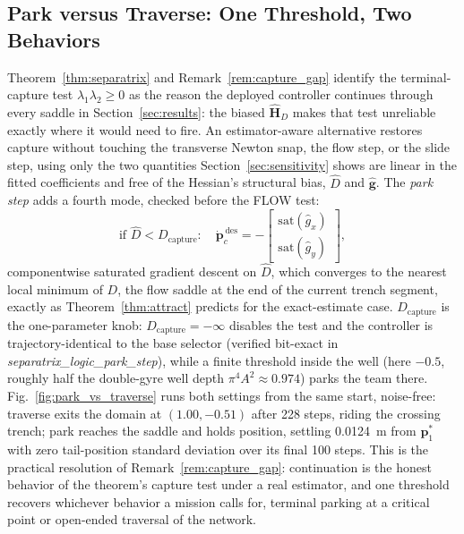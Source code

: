 \documentclass[lettersize,journal]{IEEEtran}
\begin{document}
\subsection{Park versus Traverse: One Threshold, Two Behaviors}
\label{sec:park_vs_traverse}

Theorem~\ref{thm:separatrix} and Remark~\ref{rem:capture_gap} identify
the terminal-capture test $\lambda_1\lambda_2 \geq 0$ as the reason the
deployed controller continues through every saddle in
Section~\ref{sec:results}: the biased $\hat{\mathbf{H}}_D$ makes that
test unreliable exactly where it would need to fire. An estimator-aware
alternative restores capture without touching the transverse Newton
snap, the flow step, or the slide step, using only the two quantities
Section~\ref{sec:sensitivity} shows are linear in the fitted
coefficients and free of the Hessian's structural bias, $\hat{D}$ and
$\hat{\mathbf{g}}$. The \emph{park step} adds a fourth mode, checked
before the FLOW test:
\begin{equation}
    \text{if } \hat{D} < D_{\text{capture}}:\quad
    \dot{\mathbf{p}}_c^{\,\text{des}} =
    -\begin{bmatrix}
        \mathrm{sat}(\hat{g}_x) \\ \mathrm{sat}(\hat{g}_y)
    \end{bmatrix},
    \label{eq:park_step}
\end{equation}
componentwise saturated gradient descent on $\hat{D}$, which converges
to the nearest local minimum of $D$, the flow saddle at the end of the
current trench segment, exactly as Theorem~\ref{thm:attract} predicts
for the exact-estimate case. $D_{\text{capture}}$ is the one-parameter
knob: $D_{\text{capture}} = -\infty$ disables the test and the
controller is trajectory-identical to the base selector (verified
bit-exact in \textit{separatrix\_logic\_park\_step}), while a finite
threshold inside the well (here $-0.5$, roughly half the double-gyre
well depth $\pi^4 A^2 \approx 0.974$) parks the team there.
Fig.~\ref{fig:park_vs_traverse} runs both settings from the same start,
noise-free: traverse exits the domain at $(1.00, -0.51)$ after 228
steps, riding the crossing trench; park reaches the saddle and holds
position, settling 0.0124~m from $\mathbf{p}^*_1$ with zero
tail-position standard deviation over its final 100 steps. This is the
practical resolution of Remark~\ref{rem:capture_gap}: continuation is
the honest behavior of the theorem's capture test under a real
estimator, and one threshold recovers whichever behavior a mission
calls for, terminal parking at a critical point or open-ended traversal
of the network.
\end{document}
